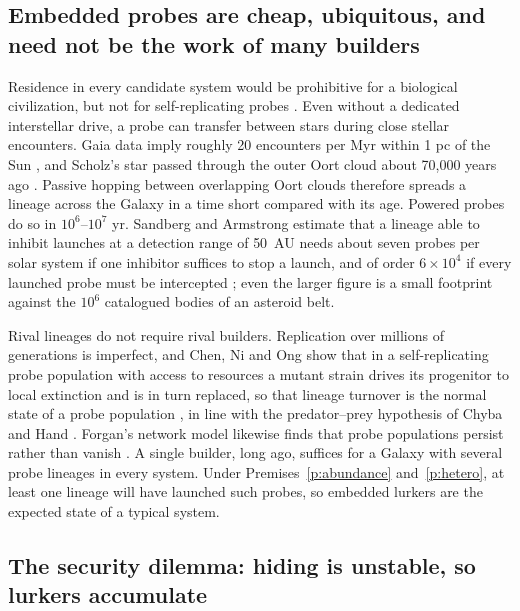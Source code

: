 \documentclass[preprint,12pt]{elsarticle}
\theoremstyle{definition}
\begin{document}
\subsection{Embedded probes are cheap, ubiquitous, and need not be the work of many builders}
\label{sec:cheap}

Residence in every candidate system would be prohibitive for a biological civilization, but not for self-replicating probes \citep{Freitas1980,Tipler1980}. Even without a dedicated interstellar drive, a probe can transfer between stars during close stellar encounters. Gaia data imply roughly 20 encounters per Myr within 1 pc of the Sun \citep{BailerJones2018}, and Scholz's star passed through the outer Oort cloud about 70,000 years ago \citep{Mamajek2015}. Passive hopping between overlapping Oort clouds therefore spreads a lineage across the Galaxy in a time short compared with its age. Powered probes do so in $10^{6}$--$10^{7}$ yr. Sandberg and Armstrong estimate that a lineage able to inhibit launches at a detection range of 50~AU needs about seven probes per solar system if one inhibitor suffices to stop a launch, and of order $6 \times 10^{4}$ if every launched probe must be intercepted \citep{SandbergArmstrong2013}; even the larger figure is a small footprint against the $10^{6}$ catalogued bodies of an asteroid belt.

Rival lineages do not require rival builders. Replication over millions of generations is imperfect, and Chen, Ni and Ong show that in a self-replicating probe population with access to resources a mutant strain drives its progenitor to local extinction and is in turn replaced, so that lineage turnover is the normal state of a probe population \citep{Chen2022}, in line with the predator--prey hypothesis of Chyba and Hand \citep{ChybaHand2005}. Forgan's network model likewise finds that probe populations persist rather than vanish \citep{Forgan2019}. A single builder, long ago, suffices for a Galaxy with several probe lineages in every system. Under Premises~\ref{p:abundance} and~\ref{p:hetero}, at least one lineage will have launched such probes, so embedded lurkers are the expected state of a typical system.

\subsection{The security dilemma: hiding is unstable, so lurkers accumulate}
\label{sec:security}
\end{document}
